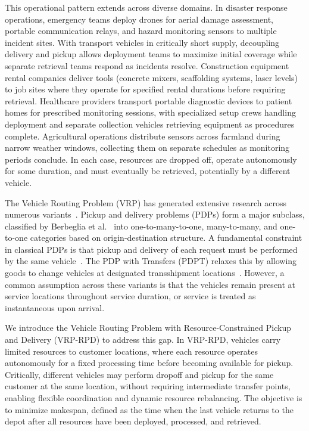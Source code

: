 \documentclass{article}
\begin{document}
This operational pattern extends across diverse domains. In disaster response operations, emergency teams deploy drones for aerial damage assessment, portable communication relays, and hazard monitoring sensors to multiple incident sites. With transport vehicles in critically short supply, decoupling delivery and pickup allows deployment teams to maximize initial coverage while separate retrieval teams respond as incidents resolve. Construction equipment rental companies deliver tools (concrete mixers, scaffolding systems, laser levels) to job sites where they operate for specified rental durations before requiring retrieval. Healthcare providers transport portable diagnostic devices to patient homes for prescribed monitoring sessions, with specialized setup crews handling deployment and separate collection vehicles retrieving equipment as procedures complete. Agricultural operations distribute sensors across farmland during narrow weather windows, collecting them on separate schedules as monitoring periods conclude. In each case, resources are dropped off, operate autonomously for some duration, and must eventually be retrieved, potentially by a different vehicle.

The Vehicle Routing Problem (VRP) has generated extensive research across numerous variants~\cite{toth2014vehicle}. Pickup and delivery problems (PDPs) form a major subclass, classified by Berbeglia et al.~\cite{berbeglia2007static} into one-to-many-to-one, many-to-many, and one-to-one categories based on origin-destination structure. A fundamental constraint in classical PDPs is that pickup and delivery of each request must be performed by the same vehicle~\cite{parragh2010variable}. The PDP with Transfers (PDPT) relaxes this by allowing goods to change vehicles at designated transshipment locations~\cite{masson2013pdpt}. However, a common assumption across these variants is that the vehicles remain present at service locations throughout service duration, or service is treated as instantaneous upon arrival.

We introduce the Vehicle Routing Problem with Resource-Constrained Pickup and Delivery (VRP-RPD) to address this gap. In VRP-RPD, vehicles carry limited resources to customer locations, where each resource operates autonomously for a fixed processing time before becoming available for pickup. Critically, different vehicles may perform dropoff and pickup for the same customer at the same location, without requiring intermediate transfer points, enabling flexible coordination and dynamic resource rebalancing. The objective is to minimize makespan, defined as the time when the last vehicle returns to the depot after all resources have been deployed, processed, and retrieved.
\end{document}

